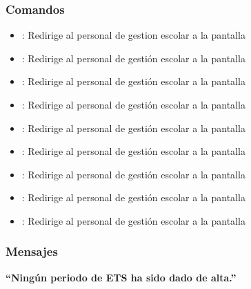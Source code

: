 \subsubsection{Comandos}
\begin{itemize}
    \item {}: Redirige al personal de gestion escolar a la pantalla 
    
    \item {}: Redirige al personal de gestión escolar a la pantalla 
    \item {}: Redirige al personal de gestión escolar a la pantalla 
    
    \item {}: Redirige al personal de gestión escolar a la pantalla 
    \item {}: Redirige al personal de gestión escolar a la pantalla 
    
    \item {}: Redirige al personal de gestión escolar a la pantalla 
    \item {}: Redirige al personal de gestión escolar a la pantalla 
    
    \item {}: Redirige al personal de gestión escolar a la pantalla 
    \item {}: Redirige al personal de gestión escolar a la pantalla 
\end{itemize}

\subsubsection{Mensajes}

\begin{Citemize}
    \item {\bf  ``Ningún periodo de ETS ha sido dado de alta.''}
\end{Citemize}


